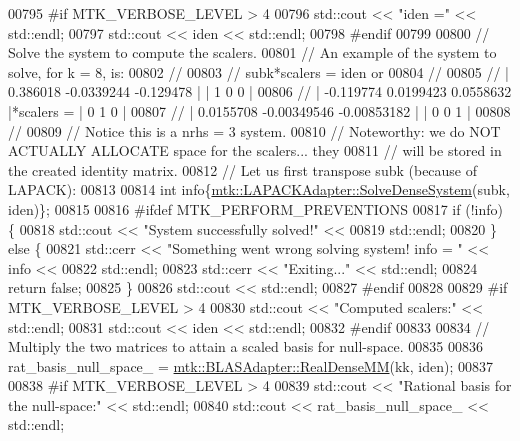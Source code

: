 \begin{DoxyCode}
{{00795 \textcolor{preprocessor}{  #if MTK\_VERBOSE\_LEVEL > 4}
00796   std::cout << \textcolor{stringliteral}{"iden ="} << std::endl;
00797   std::cout << iden << std::endl;
00798 \textcolor{preprocessor}{  #endif}
00799 
00800   \textcolor{comment}{// Solve the system to compute the scalers.}
00801   \textcolor{comment}{// An example of the system to solve, for k = 8, is:}
00802   \textcolor{comment}{//}
00803   \textcolor{comment}{// subk*scalers = iden or}
00804   \textcolor{comment}{//}
00805   \textcolor{comment}{// |  0.386018  -0.0339244   -0.129478 |           | 1 0 0 |}
00806   \textcolor{comment}{// | -0.119774   0.0199423   0.0558632 |*scalers = | 0 1 0 |}
00807   \textcolor{comment}{// | 0.0155708 -0.00349546 -0.00853182 |           | 0 0 1 |}
00808   \textcolor{comment}{//}
00809   \textcolor{comment}{// Notice this is a nrhs = 3 system.}
00810   \textcolor{comment}{// Noteworthy: we do NOT ACTUALLY ALLOCATE space for the scalers... they}
00811   \textcolor{comment}{// will be stored in the created identity matrix.}
00812   \textcolor{comment}{// Let us first transpose subk (because of LAPACK):}
00813 
00814   \textcolor{keywordtype}{int} info\{\hyperlink{classmtk_1_1LAPACKAdapter_a7428bccf74fd4a4af68fb7233846da22}{mtk::LAPACKAdapter::SolveDenseSystem}(subk, iden)\};
00815 
00816 \textcolor{preprocessor}{  #ifdef MTK\_PERFORM\_PREVENTIONS}
00817   \textcolor{keywordflow}{if} (!info) \{
00818     std::cout << \textcolor{stringliteral}{"System successfully solved!"} <<
00819       std::endl;
00820   \} \textcolor{keywordflow}{else} \{
00821     std::cerr << \textcolor{stringliteral}{"Something went wrong solving system! info = "} << info <<
00822       std::endl;
00823     std::cerr << \textcolor{stringliteral}{"Exiting..."} << std::endl;
00824     \textcolor{keywordflow}{return} \textcolor{keyword}{false};
00825   \}
00826   std::cout << std::endl;
00827 \textcolor{preprocessor}{  #endif}
00828 
00829 \textcolor{preprocessor}{  #if MTK\_VERBOSE\_LEVEL > 4}
00830   std::cout << \textcolor{stringliteral}{"Computed scalers:"} << std::endl;
00831   std::cout << iden << std::endl;
00832 \textcolor{preprocessor}{  #endif}
00833 
00834   \textcolor{comment}{// Multiply the two matrices to attain a scaled basis for null-space.}
00835 
00836   rat\_basis\_null\_space\_ = \hyperlink{classmtk_1_1BLASAdapter_acebd0e9bfe0bdd609c7fbea98ccfd3b5}{mtk::BLASAdapter::RealDenseMM}(kk, iden);
00837 
00838 \textcolor{preprocessor}{  #if MTK\_VERBOSE\_LEVEL > 4}
00839   std::cout << \textcolor{stringliteral}{"Rational basis for the null-space:"} << std::endl;
00840   std::cout << rat\_basis\_null\_space\_ << std::endl;
}}
\end{DoxyCode}
